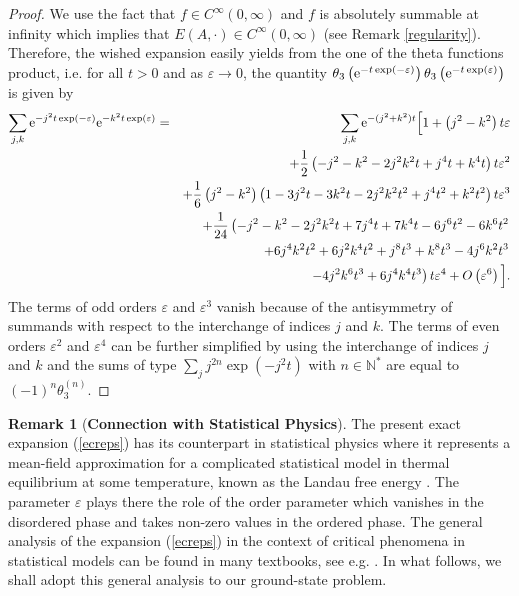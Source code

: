 \documentclass[12pt]{interact}
\theoremstyle{definition}
\newtheorem{remark}[thm]{Remark}
\newcommand{\N}{\mathbb N}
\begin{document}
\begin{proof}
We use the fact  that $f\in C^{\infty}(0,\infty)$ and $f$ is absolutely summable
at infinity which implies that $E(A,\cdot)\in C^\infty(0,\infty)$ (see Remark \ref{regularity}).
Therefore, the wished expansion easily yields from the one of
the theta functions product, i.e. for all $t>0$ and as $\varepsilon\to 0$,
the quantity $\theta_3\left({\rm e}^{-t\exp(-\varepsilon)}\right)
\theta_3\left({\rm e}^{-t\exp(\varepsilon)}\right)$ is given by
\begin{eqnarray}
\sum_{j,k} {\rm e}^{-j^2 t\exp(-\varepsilon)} {\rm e}^{-k^2 t\exp(\varepsilon)} & = &
\sum_{j,k} {\rm e}^{-(j^2+k^2)t} \Big[ 1 + \left( j^2-k^2 \right) t \varepsilon
\nonumber \\ & &
+ \frac{1}{2} \left( -j^2-k^2-2j^2 k^2 t + j^4t + k^4 t \right) t \varepsilon^2
\nonumber \\ & &
+\frac{1}{6} \left( j^2-k^2 \right) \left( 1 - 3j^2 t - 3k^2 t
-2 j^2 k^2 t^2 +j^4 t^2 + k^2 t^2 \right) t \varepsilon^3
\nonumber \\ & &
+\frac{1}{24} \left( - j^2 - k^2 -2 j^2 k^2 t + 7 j^4 t + 7 k^4 t
- 6 j^6 t^2 - 6 k^6 t^2 \right. \nonumber \\ & & \left. 
+ 6 j^4 k^2 t^2 + 6 j^2 k^4 t^2 + j^8 t^3 + k^8 t^3 - 4 j^6 k^2 t^3
\right. \nonumber \\ & & \left. - 4 j^2 k^6 t^3 + 6 j^4 k^4 t^3 \right)
t \varepsilon^4 + O\left( \varepsilon^6\right) \Big] . 
\end{eqnarray}
The terms of odd orders $\varepsilon$ and $\varepsilon^3$ vanish
because of the antisymmetry of summands with respect to the interchange
of indices $j$ and $k$.
The terms of even orders $\varepsilon^2$ and $\varepsilon^4$ can be further
simplified by using the interchange of indices $j$ and $k$ and the sums
of type $\sum_j j^{2n} \exp(- j^2 t)$ with $n\in \N^*$ are equal to
$(-1)^n \theta_3^{(n)}$.
\end{proof}

\begin{remark}[\textbf{Connection with Statistical Physics}]
The present exact expansion (\ref{ecreps}) has its counterpart
in statistical physics where it represents a mean-field approximation for
a complicated statistical model in thermal equilibrium at some temperature,
known as the Landau free energy \cite{Bausch72,Landau37}.
The parameter $\varepsilon$ plays there the role of the order parameter
which vanishes in the disordered phase and takes non-zero values in
the ordered phase.
The general analysis of the expansion (\ref{ecreps}) in the context of
critical phenomena in statistical models can be found in many textbooks,
see e.g. \cite{Landau13,Toledano87}.
In what follows, we shall adopt this general analysis to our ground-state
problem.
\end{remark}
\end{document}
